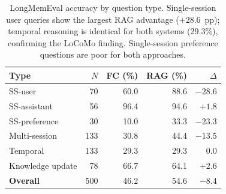 \begin{table}[!t]
\centering
\caption{LongMemEval accuracy by question type.  Single-session user queries
show the largest RAG advantage ($+28.6$~pp); temporal reasoning is identical
for both systems (29.3\%), confirming the LoCoMo finding.  Single-session
preference questions are poor for both approaches.}
\label{tab:longmemeval-types}
\small
\begin{tabular}{@{}lrrrr@{}}
\toprule
\textbf{Type} & \textbf{$N$} & \textbf{FC (\%)} & \textbf{RAG (\%)} & \textbf{$\Delta$} \\
\midrule
SS-user       &  70 & 60.0 & 88.6 & $-28.6$ \\
SS-assistant  &  56 & 96.4 & 94.6 & $+1.8$ \\
SS-preference &  30 & 10.0 & 33.3 & $-23.3$ \\
Multi-session & 133 & 30.8 & 44.4 & $-13.5$ \\
Temporal      & 133 & 29.3 & 29.3 & $0.0$ \\
Knowledge update & 78 & 66.7 & 64.1 & $+2.6$ \\
\midrule
\textbf{Overall} & 500 & 46.2 & 54.6 & $-8.4$ \\
\bottomrule
\end{tabular}
\end{table}


